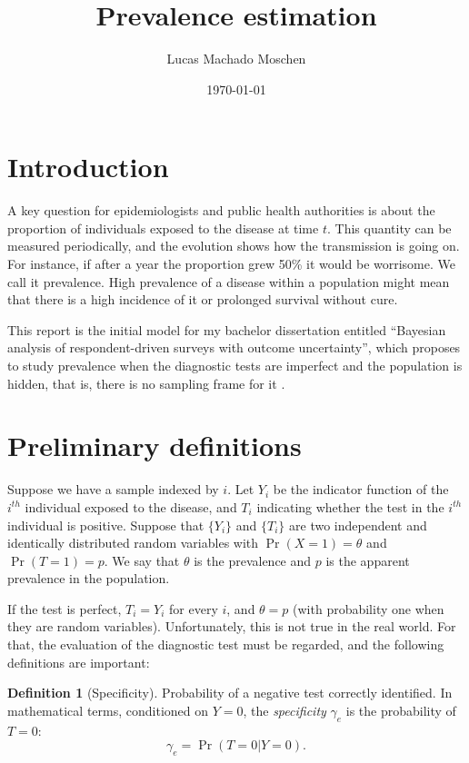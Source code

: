 \documentclass[a4paper, notitlepage, 11pt]{article}
\title{Prevalence estimation}
\author{Lucas Machado Moschen}
\affil{School of Applied Mathematics, \\ Fundação Getulio Vargas}
\date{\today}
\theoremstyle{definition}
\newtheorem{definition}{Definition}[section]
\theoremstyle{remark}
\begin{document}
\maketitle

\section{Introduction}

A key question for epidemiologists and public health authorities is about the
proportion of individuals exposed to the disease at time $t$. This quantity
can be measured periodically, and the evolution shows how the transmission is
going on. For instance, if after a year the proportion grew 50\% it would be
worrisome. We call it prevalence. High prevalence of a disease within a
population might mean that there is a high incidence of it or prolonged
survival without cure. 

This report is the initial model for my bachelor dissertation entitled ``Bayesian analysis of respondent-driven surveys with
outcome uncertainty'', which proposes to study prevalence when the diagnostic
tests are imperfect and the population is hidden, that is, there is no
sampling frame for it \cite{heckathorn1997}. 

\section{Preliminary definitions}

Suppose we have a sample indexed by $i$. Let $Y_i$ be the indicator
function of the $i^{th}$ individual exposed to the disease, and $T_i$ indicating whether the test in the $i^{th}$ individual is positive. Suppose that
$\{Y_i\}$ and $\{T_i\}$ are two independent and identically distributed
random variables with $\Pr(X = 1) = \theta$ and $\Pr(T = 1) = p$. We say that
$\theta$ is the prevalence and $p$ is the apparent prevalence in the
population. 

If the test is perfect, $T_i = Y_i$ for every $i$, and
$\theta = p$ (with probability one when they are random variables).
Unfortunately, this is not true in the real world. For that, the evaluation of
the diagnostic test must be regarded, and the following definitions are
important:

\begin{definition}[Specificity]
  Probability of a negative test correctly identified. In mathematical terms,
  conditioned on $Y = 0$, the {\em specificity} $\gamma_e$ is the probability of $T = 0$: 
  \begin{equation}
    \gamma_e = \Pr(T = 0|Y = 0). 
  \end{equation} 
\end{definition}
\end{document}

